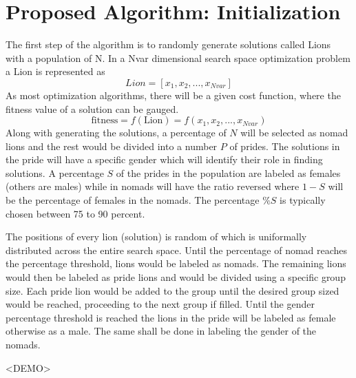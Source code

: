 \section{Proposed Algorithm: Initialization}
The first step of the algorithm is to randomly generate solutions called Lions with a population of N. In a Nvar dimensional search space optimization problem a Lion is represented as
$$Lion = [x_1, x_2,..., x_{Nvar}]$$
As most optimization algorithms, there will be a given cost function, where the fitness value of a solution can be gauged.
$$\text{fitness} = f(\text{Lion}) = f(x_1, x_2,..., x_{Nvar})$$
Along with generating the solutions, a percentage of $N$ will be selected as nomad lions and the rest would be divided into a number $P$ of prides. The solutions in the pride will have a specific gender which will identify their role in finding solutions. A percentage $S$ of the prides in the population are labeled as females (others are males) while in nomads will have the ratio reversed where $1-S$ will be the percentage of females in the nomads. The percentage $\%S$ is typically chosen between 75 to 90 percent.

The positions of every lion (solution) is random of which is uniformally distributed across the entire search space. Until the percentage of nomad reaches the percentage threshold, lions would be labeled as nomads. The remaining lions would then be labeled as pride lions and would be divided using a specific group size. Each pride lion would be added to the group until the desired group sized would be reached, proceeding to the next group if filled. Until the gender percentage threshold is reached the lions in the pride will be labeled as female otherwise as a male. The same shall be done in labeling the gender of the nomads.

<DEMO>

